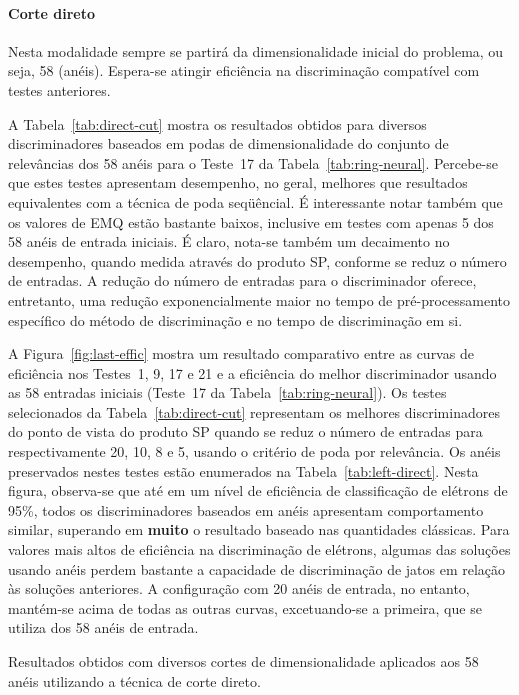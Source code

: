 \paragraph{Corte direto} Nesta modalidade sempre se partirá da
dimensionalidade inicial do problema, ou seja, 58 (anéis). Espera-se atingir
eficiência na discriminação compatível com testes anteriores.

A Tabela~\ref{tab:direct-cut} mostra os resultados obtidos para diversos
discriminadores baseados em podas de dimensionalidade do conjunto de
relevâncias dos 58 anéis para o Teste~17 da
Tabela~\ref{tab:ring-neural}. Percebe-se que estes testes apresentam
desempenho, no geral, melhores que resultados equivalentes com a técnica de
poda seqüêncial. É interessante notar também que os valores de EMQ estão
bastante baixos, inclusive em testes com apenas 5 dos 58 anéis de entrada
iniciais. É claro, nota-se também um decaimento no desempenho, quando medida
através do produto SP, conforme se reduz o número de entradas. A redução do
número de entradas para o discriminador oferece, entretanto, uma redução
exponencialmente maior no tempo de pré-processamento específico do método de
discriminação e no tempo de discriminação em si.

A Figura~\ref{fig:last-effic} mostra um resultado comparativo entre as curvas
de eficiência nos Testes~1, 9, 17 e 21 e a eficiência do melhor discriminador
usando as 58 entradas iniciais (Teste~17 da Tabela~\ref{tab:ring-neural}). Os
testes selecionados da Tabela~\ref{tab:direct-cut} representam os melhores
discriminadores do ponto de vista do produto SP quando se reduz o número de
entradas para respectivamente 20, 10, 8 e 5, usando o critério de poda por
relevância. Os anéis preservados nestes testes estão enumerados na
Tabela~\ref{tab:left-direct}. Nesta figura, observa-se que até em um nível de
eficiência de classificação de elétrons de 95\%, todos os discriminadores
baseados em anéis apresentam comportamento similar, superando em
\textbf{muito} o resultado baseado nas quantidades clássicas. Para valores
mais altos de eficiência na discriminação de elétrons, algumas das soluções
usando anéis perdem bastante a capacidade de discriminação de jatos em relação
às soluções anteriores. A configuração com 20 anéis de entrada, no entanto,
mantém-se acima de todas as outras curvas, excetuando-se a primeira, que se
utiliza dos 58 anéis de entrada.

\begin{table}
\caption{Resultados obtidos com diversos cortes de dimensionalidade aplicados
aos 58 anéis utilizando a técnica de corte direto.}
\label{tab:direct-cut}
\begin{center}
\renewcommand{\baselinestretch}{1.3}
\small
\begin{sideways}

\end{sideways}
\normalsize
\renewcommand{\baselinestretch}{1.5}
\end{center}
\end{table}

